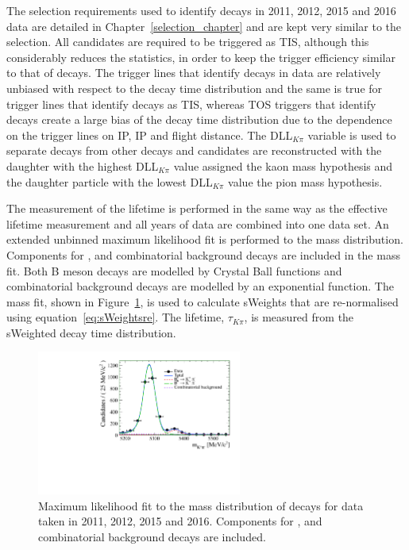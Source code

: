 The selection requirements used to identify \bdkpi decays in 2011, 2012, 2015 and 2016 data are detailed in Chapter~\ref{selection_chapter} and are kept very similar to the \bsmumu selection. All candidates are required to be triggered as TIS, although this considerably reduces the statistics, in order to keep the \bhh trigger efficiency similar to that of \bsmumu decays. %
The trigger lines that identify \bsmumu decays in data are relatively unbiased with respect to the \bs decay time distribution and the same is true for trigger lines that identify \bhh decays as TIS, whereas TOS triggers that identify \bhh decays create a large bias of the decay time distribution due to the dependence on the trigger lines on \bs IP, IP \chisqd and flight distance.
The DLL$_{K\pi}$ variable is used to separate \bdkpi decays from other \bhh decays and candidates are reconstructed with the daughter with the highest DLL$_{K\pi}$ value assigned the kaon mass hypothesis and the daughter particle with the lowest DLL$_{K\pi}$ value the pion mass hypothesis.

The measurement of the \bdki lifetime is performed in the same way as the \bsmumu effective lifetime measurement and all years of data are combined into one data set. An extended unbinned maximum likelihood fit is performed to the \bdkpi mass distribution. Components for \bdkpi, \bskpi and combinatorial background decays are included in the mass fit. Both B meson decays are modelled by Crystal Ball functions and combinatorial background decays are modelled by an exponential function. The mass fit, shown in Figure~\ref{fig:bdkpimassfit}, is used to calculate sWeights that are re-normalised using equation~\ref{eq:sWeightsre}. The lifetime, $\tau_{K\pi}$, is  measured from the sWeighted decay time distribution. 

\begin{figure}[htbp]
\centering
  \includegraphics[width=0.6\textwidth]{./Figs/LifetimeSystematics/Bd2KPi_mass_fit.pdf}
\caption{Maximum likelihood fit to the mass distribution of \bdkpi decays for data taken in 2011, 2012, 2015 and 2016. Components for \bdkpi, \bskpi and combinatorial background decays are included. }
\label{fig:bdkpimassfit}
\end{figure}


